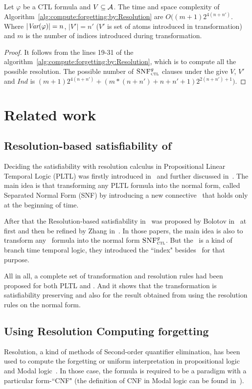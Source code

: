 \documentclass{article}
\begin{document}
\begin{proposition}
Let $\varphi$ be a CTL formula and $V \subseteq {\cal A}$.
The time and space complexity of Algorithm~\ref{alg:compute:forgetting:by:Resolution} are $O((m+1)2^{4(n+n')}$. Where $|\textit{Var}(\varphi)|=n$, $|V'|=n'$ ($V'$ is set of atoms introduced in transformation) and $m$ is the number of indices introduced during transformation.
\end{proposition}
\begin{proof}
It follows from the lines 19-31 of the algorithm~\ref{alg:compute:forgetting:by:Resolution}, which is to compute all the possible resolution.
The possible number of ${\textsc{SNF}_{\textsc{ctl}}^g}$ clauses under the give $V$, $V'$ and $Ind$ is $(m+1)2^{4(n+n')}+(m*(n+n')+n+n'+1)2^{2(n+n')+1})$.
\end{proof}

\section{Related work}
\subsection{Resolution-based satisfiability of \CTL}
Deciding the satisfiability with resolution calculus in Propositional Linear Temporal Logic (PLTL) was firstly introduced in~\cite{fisher1991resolution} and further discussed in~\cite{fisher1997normal,fisher2001clausal}. The main idea is that transforming any PLTL formula into the normal form, called Separated Normal Form (SNF) by introducing a new connective \start\ that holds only at the beginning of time.

After that the Resolution-based satisfiability in \CTL\ was proposed by Bolotov in~\cite{bolotov2000clausal} at first and then be refined by Zhang in~\cite{zhang2009refined,zhang2014resolution}.
In those papers, the main idea is also to transform any \CTL\ formula into the normal form ${\textsc{SNF}_{\textsc{ctl}}^g}$.
But the \CTL\ is a kind of branch time temporal logic, they introduced the ``index" besides \start\ for that purpose.

All in all, a complete set of transformation and resolution rules had been proposed for both PLTL and \CTL. And it shows that the transformation is satisfiability preserving and also for the result obtained from using the resolution rules on the normal form.
\subsection{Using Resolution Computing forgetting}
Resolution, a kind of methods of Second-order quantifier elimination, has been used to compute the forgetting or uniform interpretation in propositional logic~\cite{Yisong:2015:arx} and Modal logic~\cite{herzig2008uniform}. In those case, the formula is required to be a paradigm with a particular form-``CNF" (the definition of CNF in Modal logic can be found in~\cite{herzig2008uniform}).
\end{document}
